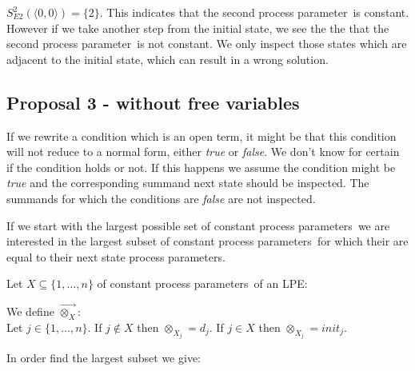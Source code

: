 \index{}\documentclass[a4paper,10pt]{article}
\theoremstyle{plain}
\theoremstyle{definition}
\newcommand{\ovr}{\overrightarrow}
\newcommand{\pp}{process parameter}
\newcommand{\pps}{process parameters}
\newcommand{\ti}{\textit}
\begin{document}
\begin{defn}
$S_{E2}^2(\langle 0,0 \rangle) = \lbrace 2 \rbrace$. This indicates that the second \pp\ is constant. However if we take another step from the initial state, we see the the that the second \pp\ is not constant. We only inspect those states which are adjacent to the initial state, which can result in a wrong solution.
\end{defn}

\subsection{Proposal 3 - without free variables}
If we rewrite a condition which is an open term, it might be that this condition will not reduce to a normal form, either \ti{true} or \ti{false}. We don't know for certain if the condition holds or not. If this happens we assume the condition might be \ti{true} and the corresponding summand next state should be inspected. The summands for which the conditions are \ti{false} are not inspected. 

If we start with the largest possible set of constant \pps\ we are interested in the largest subset of constant \pps\ for which their are equal to their next state \pps.

Let $X \subseteq \lbrace 1, \ldots, n \rbrace$ of constant \pps\ of an LPE:

\begin{defn} We define $\ovr{\otimes_X}$:\\
Let $j \in \lbrace 1, \dots, n \rbrace $. 
If $j \not\in X$ then $\otimes_{X_j} = d_j$. 
If $j \in X$ then $\otimes_{X_j} = init_j$.
\end{defn}

In order find the largest subset we give: %
\end{document}
